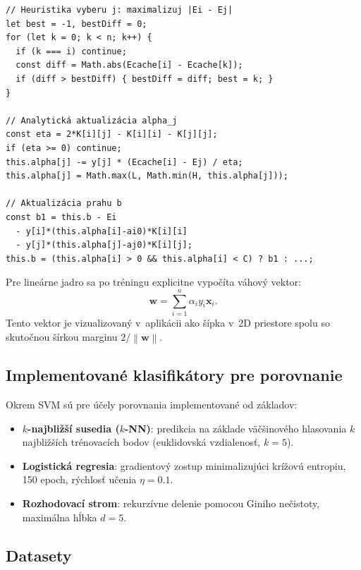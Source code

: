 \documentclass[12pt,a4paper]{article}
\newcommand{\norm}[1]{\left\lVert#1\right\rVert}
\begin{document}
\begin{lstlisting}[caption={Jadro SMO aktualizácie -- heuristika a analytická aktualizácia}]
// Heuristika vyberu j: maximalizuj |Ei - Ej|
let best = -1, bestDiff = 0;
for (let k = 0; k < n; k++) {
  if (k === i) continue;
  const diff = Math.abs(Ecache[i] - Ecache[k]);
  if (diff > bestDiff) { bestDiff = diff; best = k; }
}

// Analytická aktualizácia alpha_j
const eta = 2*K[i][j] - K[i][i] - K[j][j];
if (eta >= 0) continue;
this.alpha[j] -= y[j] * (Ecache[i] - Ej) / eta;
this.alpha[j] = Math.max(L, Math.min(H, this.alpha[j]));

// Aktualizácia prahu b
const b1 = this.b - Ei
  - y[i]*(this.alpha[i]-ai0)*K[i][i]
  - y[j]*(this.alpha[j]-aj0)*K[i][j];
this.b = (this.alpha[i] > 0 && this.alpha[i] < C) ? b1 : ...;
\end{lstlisting}

Pre lineárne jadro sa po tréningu explicitne vypočíta váhový vektor:
\begin{equation}
  \mathbf{w} = \sum_{i=1}^{n} \alpha_i y_i \mathbf{x}_i.
\end{equation}
Tento vektor je vizualizovaný v~aplikácii ako šípka v~2D priestore
spolu so skutočnou šírkou marginu $2/\norm{\mathbf{w}}$.

\subsection{Implementované klasifikátory pre porovnanie}

Okrem SVM sú pre účely porovnania implementované od základov:

\begin{itemize}
  \item \textbf{$k$-najbližší susedia ($k$-NN)}: predikcia na základe
    väčšinového hlasovania $k$ najbližších trénovacích bodov
    (euklidovská vzdialenosť, $k = 5$).
  \item \textbf{Logistická regresia}: gradientový zostup minimalizujúci
    krížovú entropiu, 150 epoch, rýchlosť učenia $\eta = 0.1$.
  \item \textbf{Rozhodovací strom}: rekurzívne delenie pomocou Giniho
    nečistoty, maximálna hĺbka $d = 5$.
\end{itemize}

\subsection{Datasety}
\end{document}
